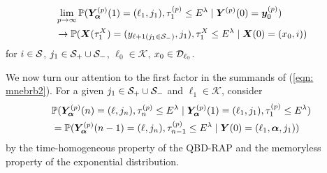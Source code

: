 \begin{align}
	&\lim_{p\to\infty}\mathbb P(\bm{Y}_{\bm{\alpha}}^{(p)}(1)=(\ell_1, j_1), \tau_{1}^{(p)}\leq E^\lambda
	 \mid \boldsymbol Y^{(p)}(0)=\boldsymbol y_0^{(p)}) \nonumber
	\\&\to \mathbb P(\boldsymbol X(\tau_1^X) = (y_{\ell+1(j_1\in\mathcal{S}_-)}, j_1), \tau_{1}^X\leq E^\lambda 
	\mid \boldsymbol X(0) = (x_0, i)) \label{eqn: aMMMMM}
\end{align}
for \(i\in\mathcal{S}\), \(j_1\in\mathcal{S}_+\cup\mathcal{S}_-\), \(\ell_0\in\mathcal K\), \(x_0\in\mathcal{D}_{\ell_0}\).

We now turn our attention to the first factor in the summands of (\ref{eqn: mnebrb2}). For a given \(j_1\in\mathcal{S}_+\cup\mathcal{S}_-\) and \(\ell_1\in\mathcal K\),  consider
\begin{align}
	&\mathbb P(\bm{Y}_{\bm{\alpha}}^{(p)}(n) = (\ell, j_n), \tau_{n}^{(p)}\leq E^\lambda 
	 \mid \bm{Y}_{\bm{\alpha}}^{(p)}(1)=(\ell_1, j_1), \tau_1^{(p)}\leq E^\lambda) \nonumber 
	\\&=\mathbb P(\bm{Y}_{\bm{\alpha}}^{(p)}(n-1) = (\ell, j_n), \tau_{n-1}^{(p)}\leq E^\lambda 
	 \mid \boldsymbol Y(0)=(\ell_1,\boldsymbol \alpha, j_1))\label{eqn: dskvnaSF}
\end{align}
by the time-homogeneous property of the QBD-RAP and the memoryless property of the exponential distribution.

